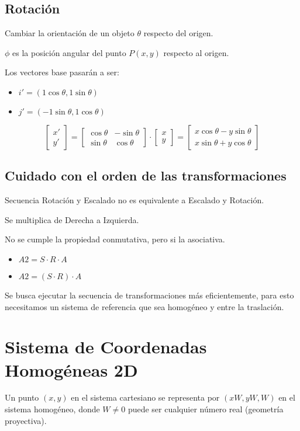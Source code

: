\subsection{Rotación}
Cambiar la orientación de un objeto $\theta$ respecto del origen.

$\phi$ es la posición angular del punto $P(x, y)$ respecto al origen.

Los vectores base pasarán a ser:
\begin{itemize}
    \item $i'=(1 \cos \theta , 1 \sin \theta)$
    \item $j'=(-1 \sin \theta, 1 \cos \theta)$
\end{itemize}

$$\left[\begin{matrix}
x' \\ y'
\end{matrix}\right] =
\left[\begin{matrix}
\cos \theta & - \sin \theta \\ \sin \theta & \cos \theta
\end{matrix}\right] \cdot
\left[\begin{matrix}
x \\ y
\end{matrix}\right]=
\left[\begin{matrix}
x \cos \theta - y \sin \theta \\ x \sin \theta + y \cos \theta
\end{matrix}\right]$$

\subsection{Cuidado con el orden de las transformaciones}
Secuencia Rotación y Escalado no es equivalente a Escalado y Rotación.

Se multiplica de Derecha a Izquierda.

No se cumple la propiedad conmutativa, pero si la asociativa.
\begin{itemize}
    \item $A2 = S \cdot R \cdot A$
    \item $A2 = (S \cdot R) \cdot A$
\end{itemize}

Se busca ejecutar la secuencia de transformaciones más eficientemente, para esto necesitamos un sistema de referencia que sea homogéneo y entre la traslación.

\section{Sistema de Coordenadas Homogéneas 2D}
Un punto $( x , y )$ en el sistema cartesiano se representa por $( xW , yW , W )$ en el sistema homogéneo, donde $W\neq 0$ puede ser cualquier número real (geometría proyectiva).

